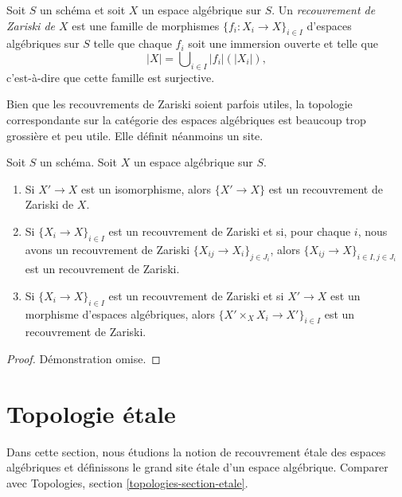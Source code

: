 \begin{definition}
\label{definition-zariski-covering}
Soit $S$ un schéma et soit $X$ un espace algébrique sur $S$.
Un {\it recouvrement de Zariski de $X$} est une famille de morphismes
$\{f_i : X_i \to X\}_{i \in I}$ d'espaces algébriques sur $S$
telle que chaque $f_i$ soit une immersion ouverte
et telle que
$$
|X| = \bigcup\nolimits_{i \in I} |f_i|(|X_i|),
$$
c'est-à-dire que cette famille est surjective.
\end{definition}

\noindent
Bien que les recouvrements de Zariski soient parfois utiles, la topologie correspondante
sur la catégorie des espaces algébriques est beaucoup trop grossière et peu
utile. Elle définit néanmoins un site.

\begin{lemma}
\label{lemma-zariski}
Soit $S$ un schéma.
Soit $X$ un espace algébrique sur $S$.
\begin{enumerate}
\item Si $X' \to X$ est un isomorphisme, alors $\{X' \to X\}$
est un recouvrement de Zariski de $X$.
\item Si $\{X_i \to X\}_{i\in I}$ est un recouvrement de Zariski et si, pour chaque
$i$, nous avons un recouvrement de Zariski $\{X_{ij} \to X_i\}_{j\in J_i}$, alors
$\{X_{ij} \to X\}_{i \in I, j\in J_i}$ est un recouvrement de Zariski.
\item Si $\{X_i \to X\}_{i\in I}$ est un recouvrement de Zariski
et si $X' \to X$ est un morphisme d'espaces algébriques, alors
$\{X' \times_X X_i \to X'\}_{i\in I}$ est un recouvrement de Zariski.
\end{enumerate}
\end{lemma}

\begin{proof}
Démonstration omise.
\end{proof}










\section{Topologie \'etale}
\label{section-etale}

\noindent
Dans cette section, nous étudions la notion de recouvrement \'etale des
espaces algébriques et définissons le grand site \'etale d'un
espace algébrique. Comparer avec
Topologies, section \ref{topologies-section-etale}.

